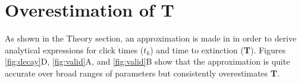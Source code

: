 \documentclass[9pt,lineno]{elife}
\begin{document}
\begin{appendixbox}



\end{appendixbox}

\begin{appendixbox}


\label{app:jensen}
\section{Overestimation of \textbf{T}}
As shown in the Theory section, an approximation is made in  in order to derive analytical expressions for click times ($t_k$) and time to extinction (\textbf{T}). 
Figures \ref{fig:decay}D, \ref{fig:valid}A, and \ref{fig:valid}B show that the approximation is quite accurate over broad ranges of parameters but consistently overestimates \textbf{T}.


\end{appendixbox}
\end{document}
